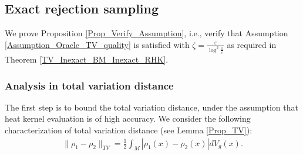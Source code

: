 \subsection{Exact rejection sampling}\label{Subsection_exact_rej}

We prove Proposition \ref{Prop_Verify_Assumption}, i.e., 
verify that Assumption \ref{Assumption_Oracle_TV_quality} is satisfied with $\zeta = \frac{\varepsilon}{\log^{2} \frac{1}{\varepsilon}}$ 
as required in Theorem \ref{TV_Inexact_BM_Inexact_RHK}.

\subsubsection{Analysis in total variation distance}

The first step is to bound the total variation distance, under the assumption that heat kernel evaluation is of high accuracy.
We consider the following characterization of total variation distance (see Lemma \ref{Prop_TV}):
\begin{align*}
        \|\rho_{1} - \rho_{2}\|_{TV}
        = \frac{1}{2} \int_{M} |\rho_{1}(x) - \rho_{2}(x)| dV_{g}(x).
\end{align*}

